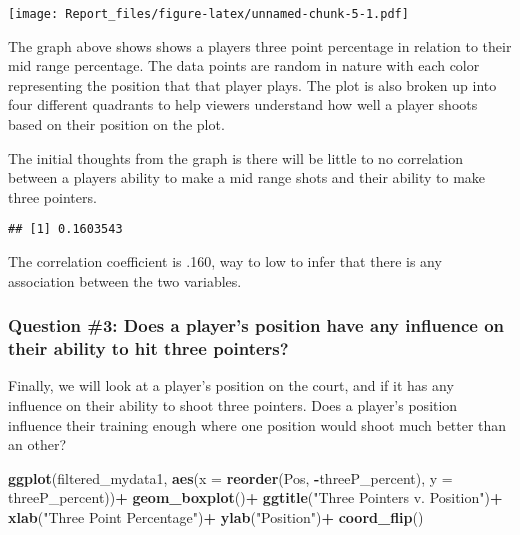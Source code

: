 \documentclass[
]{article}
\newenvironment{Shaded}{\begin{snugshade}}{\end{snugshade}}
\newcommand{\AttributeTok}[1]{\textcolor[rgb]{0.13,0.29,0.53}{#1}}
\newcommand{\FunctionTok}[1]{\textcolor[rgb]{0.13,0.29,0.53}{\textbf{#1}}}
\newcommand{\NormalTok}[1]{#1}
\newcommand{\SpecialCharTok}[1]{\textcolor[rgb]{0.81,0.36,0.00}{\textbf{#1}}}
\newcommand{\StringTok}[1]{\textcolor[rgb]{0.31,0.60,0.02}{#1}}
\begin{document}
\texttt{[image: Report\_files/figure-latex/unnamed-chunk-5-1.pdf]}

The graph above shows shows a players three point percentage in relation
to their mid range percentage. The data points are random in nature with
each color representing the position that that player plays. The plot is
also broken up into four different quadrants to help viewers understand
how well a player shoots based on their position on the plot.

The initial thoughts from the graph is there will be little to no
correlation between a players ability to make a mid range shots and
their ability to make three pointers.

\begin{Shaded}
\end{Shaded}

\begin{verbatim}
## [1] 0.1603543
\end{verbatim}

The correlation coefficient is .160, way to low to infer that there is
any association between the two variables.

\subsubsection{\texorpdfstring{\textbf{Question \#3: Does a player's
position have any influence on their ability to hit three
pointers?}}{Question \#3: Does a player's position have any influence on their ability to hit three pointers?}}\label{question-3-does-a-players-position-have-any-influence-on-their-ability-to-hit-three-pointers}

Finally, we will look at a player's position on the court, and if it has
any influence on their ability to shoot three pointers. Does a player's
position influence their training enough where one position would shoot
much better than an other?

\begin{Shaded}
\begin{Highlighting}[]
\FunctionTok{ggplot}\NormalTok{(filtered\_mydata1, }\FunctionTok{aes}\NormalTok{(}\AttributeTok{x =} \FunctionTok{reorder}\NormalTok{(Pos, }\SpecialCharTok{{-}}\NormalTok{threeP\_percent), }\AttributeTok{y =}\NormalTok{ threeP\_percent))}\SpecialCharTok{+}
  \FunctionTok{geom\_boxplot}\NormalTok{()}\SpecialCharTok{+}
  \FunctionTok{ggtitle}\NormalTok{(}\StringTok{"Three Pointers v. Position"}\NormalTok{)}\SpecialCharTok{+}
  \FunctionTok{xlab}\NormalTok{(}\StringTok{"Three Point Percentage"}\NormalTok{)}\SpecialCharTok{+}
  \FunctionTok{ylab}\NormalTok{(}\StringTok{"Position"}\NormalTok{)}\SpecialCharTok{+}
  \FunctionTok{coord\_flip}\NormalTok{()}
\end{Highlighting}
\end{Shaded}
\end{document}

